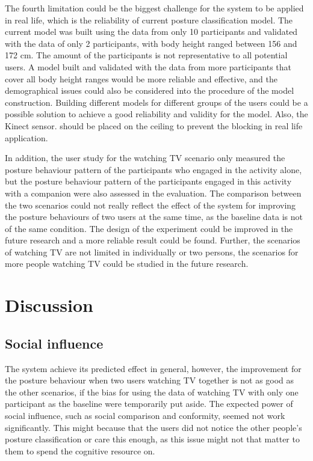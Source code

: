 The fourth limitation could be the biggest challenge for the system to be applied in real life, which is the reliability of current posture classification model. The current model was built using the data from only 10 participants and validated with the data of only 2 participants, with body height ranged between 156 and 172 cm. The amount of the participants is not representative to all potential users. A model built and validated with the data from more participants that cover all body height ranges would be more reliable and effective, and the demographical issues could also be considered into the procedure of the model construction. Building different models for different groups of the users could be a possible solution to achieve a good reliability and validity for the model. Also, the Kinect sensor. should be placed on the ceiling to prevent the blocking in real life application.

In addition, the user study for the watching TV scenario only measured the posture behaviour pattern of the participants who engaged in the activity alone, but the posture behaviour pattern of the participants engaged in this activity with a companion were also assessed in the evaluation. The comparison between the two scenarios could not really reflect the effect of the system for improving the posture behaviours of two users at the same time, as the baseline data is not of the same condition. The design of the experiment could be improved in the future research and a more reliable result could be found. Further, the scenarios of watching TV are not limited in individually or two persons, the scenarios for more people watching TV could be studied in the future research.

\section{Discussion}
\subsection{Social influence}
The system achieve its predicted effect in general, however, the improvement for the posture behaviour when two users watching TV together is not as good as the other scenarios, if the bias for using the data of watching TV with only one participant as the baseline were temporarily put aside. The expected power of social influence, such as social comparison and conformity, seemed not work significantly. This might because that the users did not notice the other people’s posture classification or care this enough, as this issue might not that matter to them to spend the cognitive resource on.

